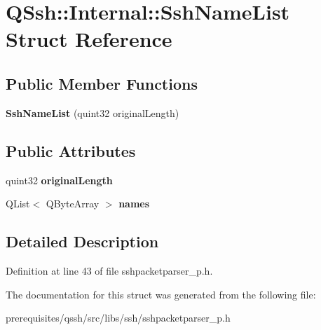 \hypertarget{struct_q_ssh_1_1_internal_1_1_ssh_name_list}{}\section{Q\+Ssh\+:\+:Internal\+:\+:Ssh\+Name\+List Struct Reference}
\label{struct_q_ssh_1_1_internal_1_1_ssh_name_list}
\subsection*{Public Member Functions}
\begin{DoxyCompactItemize}
\item 
\mbox{\label{struct_q_ssh_1_1_internal_1_1_ssh_name_list_af02b5d943cd6780c19a3b94e3d8081a8}} 
{\bfseries Ssh\+Name\+List} (quint32 original\+Length)
\end{DoxyCompactItemize}
\subsection*{Public Attributes}
\begin{DoxyCompactItemize}
\item 
\mbox{\label{struct_q_ssh_1_1_internal_1_1_ssh_name_list_af6552ea1be6bf6980d679ab18f0cea05}} 
quint32 {\bfseries original\+Length}
\item 
\mbox{\label{struct_q_ssh_1_1_internal_1_1_ssh_name_list_a2fd5066cb479d4f3304908bd965a0ece}} 
Q\+List$<$ Q\+Byte\+Array $>$ {\bfseries names}
\end{DoxyCompactItemize}


\subsection{Detailed Description}


Definition at line 43 of file sshpacketparser\+\_\+p.\+h.



The documentation for this struct was generated from the following file\+:\begin{DoxyCompactItemize}
\item 
prerequisites/qssh/src/libs/ssh/sshpacketparser\+\_\+p.\+h\end{DoxyCompactItemize}

